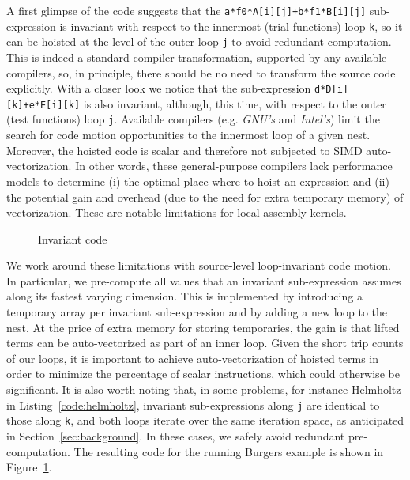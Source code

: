 A first glimpse of the code suggests that the \texttt{a*f0*A[i][j]+b*f1*B[i][j]} sub-expression is invariant with respect to the innermost (trial functions) loop \texttt{k}, so it can be hoisted at the level of the outer loop \texttt{j} to avoid redundant computation. This is indeed a standard compiler transformation, supported by any available compilers, so, in principle, there should be no need to transform the source code explicitly. With a closer look we notice that the sub-expression \texttt{d*D[i][k]+e*E[i][k]} is also invariant, although, this time, with respect to the outer (test functions) loop \texttt{j}. Available compilers (e.g. \emph{GNU's} and \emph{Intel's}) limit the search for code motion opportunities to the innermost loop of a given nest. Moreover, the hoisted code is scalar and therefore not subjected to SIMD auto-vectorization. In other words, these general-purpose compilers lack performance models to determine (i) the optimal place where to hoist an expression and (ii) the potential gain and overhead (due to the need for extra temporary memory) of vectorization. These are notable limitations for local assembly kernels. 

\begin{figure}
\centering
\label{code:invariant-code}
\footnotesize

\caption{Invariant code}
\end{figure}

We work around these limitations with source-level loop-invariant code motion. In particular, we pre-compute all values that an invariant sub-expression assumes along its fastest varying dimension. This is implemented by introducing a temporary array per invariant sub-expression and by adding a new loop to the nest. At the price of extra memory for storing temporaries, the gain is that lifted terms can be auto-vectorized as part of an inner loop. Given the short trip counts of our loops, it is important to achieve auto-vectorization of hoisted terms in order to minimize the percentage of scalar instructions, which could otherwise be significant. It is also worth noting that, in some problems, for instance Helmholtz in Listing~\ref{code:helmholtz}, invariant sub-expressions along \texttt{j} are identical to those along \texttt{k}, and both loops iterate over the same iteration space, as anticipated in Section~\ref{sec:background}. In these cases, we safely avoid redundant pre-computation. The resulting code for the running Burgers example is shown in Figure~\ref{code:invariant-code}.

